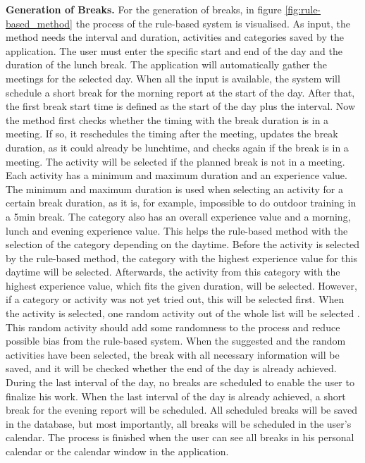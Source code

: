 \documentclass{hasel_thesis}
\begin{document}
\textbf{Generation of Breaks.} For the generation of breaks, in figure \ref{fig:rule-based_method} the process of the rule-based system is visualised. As input, the method needs the interval and duration, activities and categories saved by the application. The user must enter the specific start and end of the day and the duration of the lunch break. The application will automatically gather the meetings for the selected day. When all the input is available, the system will schedule a short break for the morning report at the start of the day. After that, the first break start time is defined as the start of the day plus the interval. Now the method first checks whether the timing with the break duration is in a meeting. If so, it reschedules the timing after the meeting, updates the break duration, as it could already be lunchtime, and checks again if the break is in a meeting. The activity will be selected if the planned break is not in a meeting. Each activity has a minimum and maximum duration and an experience value. The minimum and maximum duration is used when selecting an activity for a certain break duration, as it is, for example, impossible to do outdoor training in a 5min break. The category also has an overall experience value and a morning, lunch and evening experience value. This helps the rule-based method with the selection of the category depending on the daytime. Before the activity is selected by the rule-based method, the category with the highest experience value for this daytime will be selected. Afterwards, the activity from this category with the highest experience value, which fits the given duration, will be selected. However, if a category or activity was not yet tried out, this will be selected first. When the activity is selected, one random activity out of the whole list will be selected . This random activity should add some randomness to the process and reduce possible bias from the rule-based system. When the suggested and the random activities have been selected, the break with all necessary information will be saved, and it will be checked whether the end of the day is already achieved. During the last interval of the day, no breaks are scheduled to enable the user to finalize his work. When the last interval of the day is already achieved, a short break for the evening report will be scheduled. All scheduled breaks will be saved in the database, but most importantly, all breaks will be scheduled in the user's calendar. The process is finished when the user can see all breaks in his personal calendar or the calendar window in the application.
\end{document}
